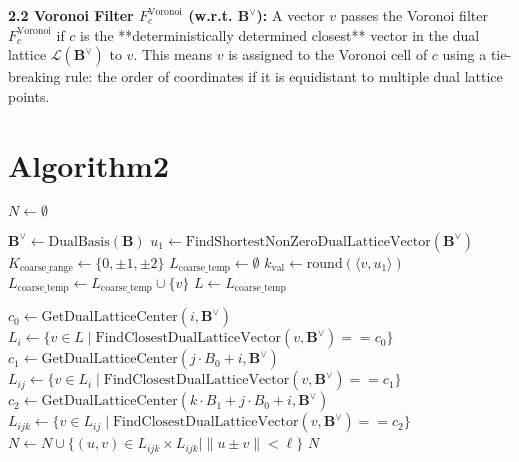 \documentclass{article}
\begin{document}
\textbf{2.2 Voronoi Filter $F_{c}^{\text{Voronoi}}$ (w.r.t. $\mathbf{B}^{\vee}$):} A vector $v$ passes the Voronoi filter $F_{c}^{\text{Voronoi}}$ if $c$ is the **deterministically determined closest** vector in the dual lattice $\mathcal{L}(\mathbf{B}^{\vee})$ to $v$. This means $v$ is assigned to the Voronoi cell of $c$ using a tie-breaking rule: the order of coordinates if it is equidistant to multiple dual lattice points.
\clearpage %

\section{Algorithm2}

 \label{alg:all_pair_search_updated}
\begin{algorithmic}[2]
\State $N \gets \emptyset$

\State $\mathbf{B}^{\vee} \gets \text{DualBasis}(\mathbf{B})$ 
\State $u_1 \gets \text{FindShortestNonZeroDualLatticeVector}(\mathbf{B}^{\vee})$ 
\State $K_{\text{coarse\_range}} \gets \{0, \pm 1, \pm 2\}$
\State $L_{\text{coarse\_temp}} \gets \emptyset$
    \State $k_{\text{val}} \gets \text{round}(\langle v, u_1 \rangle)$ 
        \State $L_{\text{coarse\_temp}} \gets L_{\text{coarse\_temp}} \cup \{v\}$
    \EndIf
\EndFor
\State $L \gets L_{\text{coarse\_temp}}$ 

    \State $c_0 \gets \text{GetDualLatticeCenter}(i, \mathbf{B}^{\vee})$
    \State $L_i \gets \{ v \in L \mid \text{FindClosestDualLatticeVector}(v, \mathbf{B}^{\vee}) == c_0 \}$
        \State $c_1 \gets \text{GetDualLatticeCenter}(j \cdot B_0 + i, \mathbf{B}^{\vee})$ 
        \State $L_{ij} \gets \{ v \in L_i \mid \text{FindClosestDualLatticeVector}(v, \mathbf{B}^{\vee}) == c_1 \}$
            \State $c_2 \gets \text{GetDualLatticeCenter}(k \cdot B_1 + j \cdot B_0 + i, \mathbf{B}^{\vee})$
            \State $L_{ijk} \gets \{ v \in L_{ij} \mid \text{FindClosestDualLatticeVector}(v, \mathbf{B}^{\vee}) == c_2 \}$
            \State $N \gets N \cup \{ (u, v) \in L_{ijk} \times L_{ijk} \mid \|u \pm v\| < \ell \}$
        \EndFor
    \EndFor
\EndFor
\State \Return $N$
\end{algorithmic}
\end{document}
